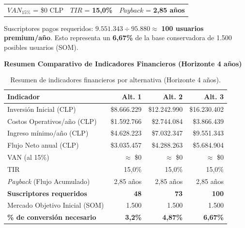 \documentclass[12pt]{article}
\begin{document}
\begin{center}
\begin{tabular}{lll}
    $VAN_{15\%}$ = \$0 CLP \quad & $TIR$ = \textbf{15,0\%} \quad & $Payback$ = \textbf{2,85 años}
\end{tabular}
\end{center}

Suscriptores pagos requeridos: $9.551.343 \div 95.880 \approx$ \textbf{100 usuarios premium/año}.
Esto representa un \textbf{6,67\%} de la base conservadora de 1.500 posibles usuarios (SOM).

\newpage
\textbf{Resumen Comparativo de Indicadores Financieros (Horizonte 4 años)}

\begin{table}[h!]
    \centering
    \renewcommand{\arraystretch}{1.5}
    \begin{tabular}{|m{4.5cm}|r|r|r|}
        \hline
        \rowcolor[HTML]{EFEFEF}
        \textbf{Indicador} & \textbf{Alt. 1} & \textbf{Alt. 2} & \textbf{Alt. 3} \\ \hline
        Inversión Inicial (CLP) & \$8.666.229 & \$12.242.990 & \$16.230.402 \\ \hline
        Costos Operativos/año (CLP) & \$1.592.766 & \$2.744.084 & \$3.866.439 \\ \hline
        Ingreso mínimo/año (CLP) & \$4.628.223 & \$7.032.347 & \$9.551.343 \\ \hline
        Flujo Neto anual (CLP) & \$3.035.457 & \$4.288.263 & \$5.684.904 \\ \hline
        VAN (al 15\%) & $\approx$ \$0 & $\approx$ \$0 & $\approx$ \$0 \\ \hline
        TIR & 15,0\% & 15,0\% & 15,0\% \\ \hline
        \textit{Payback} (Flujo Acumulado) & 2,85 años & 2,85 años & 2,85 años \\ \hline
        \rowcolor[HTML]{E8F5E9}
        \textbf{Suscriptores requeridos} & \textbf{48} & \textbf{73} & \textbf{100} \\ \hline
        Mercado Objetivo Inicial (SOM) & 1.500 & 1.500 & 1.500 \\ \hline
        \rowcolor[HTML]{E8F5E9}
        \textbf{\% de conversión necesario} & \textbf{3,2\%} & \textbf{4,87\%} & \textbf{6,67\%} \\ \hline
    \end{tabular}
    \caption{Resumen de indicadores financieros por alternativa (Horizonte 4 años).}
    \label{tab:resumen_financiero}
\end{table}
\end{document}

